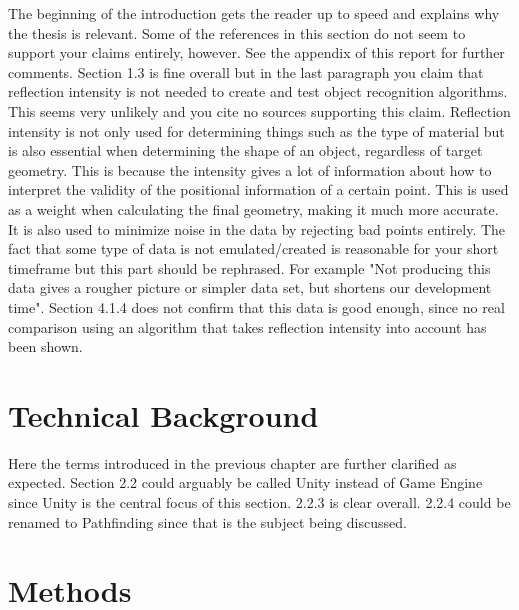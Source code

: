 \documentclass[12pt,a4paper,twoside,openright]{report}
\begin{document}
	The beginning of the introduction gets the reader up to speed and explains
	why the thesis is relevant. Some of the references in this section do not
	seem to support your claims entirely, however. See the appendix of this
	report for further comments. Section 1.3 is fine overall but in the last
	paragraph you claim that reflection intensity is not needed to create and
	test object recognition algorithms. This seems very unlikely and you cite
	no sources supporting this claim. Reflection intensity is not only used for
	determining things such as the type of material but is also essential when
	determining the shape of an object, regardless of target geometry. This is
	because the intensity gives a lot of information about how to interpret the
	validity of the positional information of a certain point. This is used as
	a weight when calculating the final geometry, making it much more accurate.
	It is also used to minimize noise in the data by rejecting bad points
	entirely. The fact that some type of data is not emulated/created is
	reasonable for your short timeframe but this part should be rephrased. For
	example "Not producing this data gives a rougher picture or simpler data
	set, but shortens our development time". Section 4.1.4 does not confirm
	that this data is good enough, since no real comparison using an algorithm
	that takes reflection intensity into account has been shown. 

\section*{Technical Background}

	Here the terms introduced in the previous chapter are further clarified as
	expected. Section 2.2 could arguably be called Unity instead of Game Engine
	since Unity is the central focus of this section. 2.2.3 is clear overall.
	2.2.4 could be renamed to Pathfinding since that is the subject being
	discussed. 

\section*{Methods}
\end{document}
